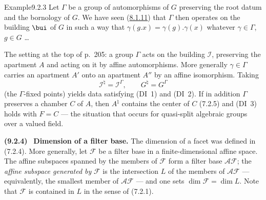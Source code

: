 \documentclass[12pt,a4paper,oneside,english]{smfart}
\makeatletter
\newcommand{\btanchor}[1]{\leavevmode\Hy@raisedlink{\hypertarget{bt:#1}{}}}
\newcommand{\btref}[1]{\hyperlink{bt:#1}{#1}}
\theoremstyle{definition}
\theoremstyle{bt}
\makeatother
\begin{document}
\begin{stmtup}{Example}{9.2.3}\btanchor{9.2.3}
Let $\Gamma$ be a group of automorphisms of $G$ preserving the root datum and the
bornology of $G$. We have seen (\btref{8.1.11}) that $\Gamma$ then operates on the building
$\bui$ of $G$ in such a way that $\gamma(g.x)=\gamma(g).\gamma(x)$ whatever
$\gamma\in\Gamma$, $g\in G$ \dots
\end{stmtup}
\par\endgroup

\begingroup\providecommand{\nat}{}
\renewcommand{\nat}{^{\natural}}
\providecommand{\Imm}{}
\renewcommand{\Imm}{\mathscr{I}}
\providecommand{\Fil}{}
\renewcommand{\Fil}{\mathscr{F}}
\providecommand{\AFil}{}
\renewcommand{\AFil}{\mathscr{A}\mathscr{F}}
\providecommand{\R}{}
\renewcommand{\R}{\mathbf{R}}
\providecommand{\N}{}
\renewcommand{\N}{\mathbf{N}}
\providecommand{\Card}{}
\renewcommand{\Card}{\operatorname{Card}}
\providecommand{\Aut}{}
\renewcommand{\Aut}{\operatorname{Aut}}
\providecommand{\Hom}{}
\renewcommand{\Hom}{\operatorname{Hom}}
\providecommand{\Is}{}
\renewcommand{\Is}{\operatorname{Is}}
\providecommand{\Sm}{}
\renewcommand{\Sm}{\operatorname{Sim}}
\providecommand{\id}{}
\renewcommand{\id}{\mathrm{id.}}
\providecommand{\Kse}{}
\renewcommand{\Kse}{\mathrm{K}_{\sigma,\varepsilon}}
\providecommand{\Khse}{}
\renewcommand{\Khse}{\widehat{\mathrm{K}}_{\sigma,\varepsilon}}
\providecommand{\op}{}
\renewcommand{\op}[1]{\mathopen{]}#1\mathclose{[}}
\providecommand{\st}{}
\renewcommand{\st}[1]{\medskip\noindent\textbf{#1}\ ---\ }
\providecommand{\num}{}
\renewcommand{\num}[1]{\medskip\noindent\textbf{(#1)}\ }
\providecommand{\pf}{}
\renewcommand{\pf}{\smallskip\noindent\textit{Argument (outline).}\ }
\bigskip

The setting at the top of p.~205: a group $\Gamma$ acts on the building $\Imm$,
preserving the apartment $A$ and acting on it by affine automorphisms. More
generally $\gamma\in\Gamma$ carries an apartment $A'$ onto an apartment $A''$ by
an affine isomorphism. Taking
\[
\Imm\nat=\Imm^{\Gamma},\qquad G\nat=G^{\Gamma}
\]
(the $\Gamma$-fixed points) yields data satisfying (DI~1) and (DI~2). If in
addition $\Gamma$ preserves a chamber $C$ of $A$, then $A\nat$ contains the
center of $C$ (7.2.5) and (DI~3) holds with $F=C$ --- the situation that occurs
for quasi-split algebraic groups over a valued field.

\num{9.2.4}\btanchor{9.2.4} \textbf{Dimension of a filter base.}
The dimension of a facet was defined in (7.2.4). More generally, let $\Fil$ be a
filter base in a finite-dimensional affine space. The affine subspaces spanned
by the members of $\Fil$ form a filter base $\AFil$; the \emph{affine subspace
generated by} $\Fil$ is the intersection $L$ of the members of $\AFil$ --- equivalently,
the smallest member of $\AFil$ --- and one sets $\dim\Fil=\dim L$. Note that
$\Fil$ is contained in $L$ in the sense of (7.2.1).
\end{document}
